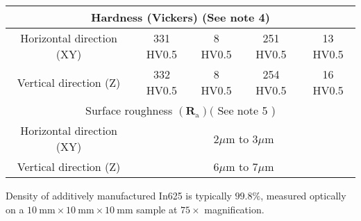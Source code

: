 \documentclass[10pt]{article}
\begin{document}
\begin{center}
\begin{tabular}{|c|c|c|c|c|}
\multicolumn{5}{|c|}{Hardness (Vickers) (See note 4)} \\
\hline
Horizontal direction (XY) & 331 HV0.5 & 8 HV0.5 & 251 HV0.5 & 13 HV0.5 \\
\hline
Vertical direction (Z) & 332 HV0.5 & 8 HV0.5 & 254 HV0.5 & 16 HV0.5 \\
\hline
\multicolumn{5}{|c|}{Surface roughness $\left(\mathbf{R}_{\mathrm{a}}\right)($ See note 5 )} \\
\hline
Horizontal direction (XY) & \multicolumn{4}{|c|}{$2 \mu \mathrm{m}$ to $3 \mu \mathrm{m}$} \\
\hline
Vertical direction (Z) & \multicolumn{4}{|c|}{$6 \mu \mathrm{m}$ to $7 \mu \mathrm{m}$} \\
\hline
\end{tabular}
\end{center}

Density of additively manufactured In625 is typically $99.8 \%$, measured optically on a $10 \mathrm{~mm} \times 10 \mathrm{~mm} \times 10 \mathrm{~mm}$ sample at $75 \times$ magnification.
\end{document}
